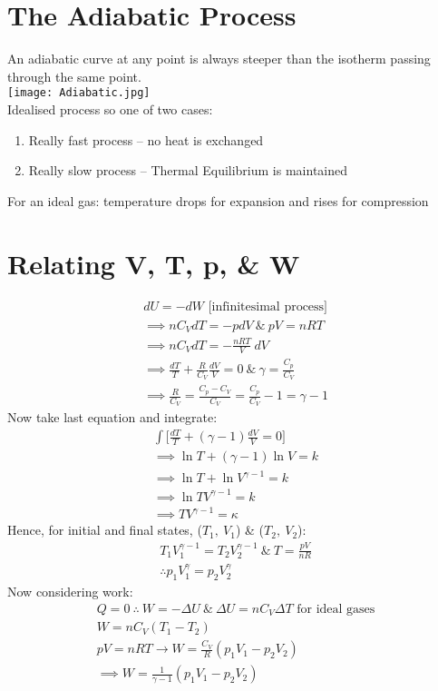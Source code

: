 \documentclass[a4paper, 11pt, fleqn, normalem]{report}
\begin{document}
\section{The Adiabatic Process}
An adiabatic curve at any point is always steeper than the isotherm passing through the same point. \\
\texttt{[image: Adiabatic.jpg]} \\
Idealised process so one of two cases:
\begin{enumerate}
	\item Really fast process -- no heat is exchanged
	\item Really slow process -- Thermal Equilibrium is maintained
\end{enumerate}
For an ideal gas: temperature drops for expansion and rises for compression

\section{Relating V, T, p, \& W}
\vspace{-24pt}
\begin{gather*}
	dU = -dW \text{ [infinitesimal process]} \\
	\implies nC_{V}dT = -pdV ~\&~ pV = nRT \\
	\implies nC_{V}dT = -\frac{nRT}{V}\:dV \\
	\implies \frac{dT}{T} + \frac{R}{C_{V}}\frac{dV}{V} = 0 ~\&~ \gamma = \frac{C_{p}}{C_{V}} \\
	\implies \frac{R}{C_{V}} = \frac{C_{p} - C_{V}}{C_{V}} = \frac{C_{p}}{C_{V}} - 1 = \gamma - 1
\end{gather*}
Now take last equation and integrate:
\begin{gather*}
	\int \bigg[\frac{dT}{T} + (\gamma - 1)\frac{dV}{V} = 0\bigg] \\
	\implies \ln{T} + (\gamma - 1)\ln{V} = k \\
	\implies \ln{T} + \ln{V^{\gamma - 1}} = k \\
	\implies \ln{TV^{\gamma - 1}} = k \\
	\implies TV^{\gamma - 1} = \kappa
\end{gather*}
Hence, for initial and final states, ($T_{1},\:V_{1}$) \& ($T_{2},\:V_{2}$):
\begin{gather*}
	T_{1}V_{1}^{\gamma - 1} = T_{2}V_{2}^{\gamma - 1} ~\&~ T = \frac{pV}{nR} \\
	\therefore p_{1}V_{1}^{\gamma} = p_{2}V_{2}^{\gamma}
\end{gather*}
Now considering work:
\begin{gather*}
	Q = 0 ~\therefore~ W = -{\Delta}U ~\&~ {\Delta}U = nC_{V}{\Delta}T \text{ for ideal gases} \\
	W = nC_{V}(T_{1} - T_{2}) \\
	pV = nRT \rightarrow W = \frac{C_{V}}{R}(p_{1}V_{1} - p_{2}V_{2}) \\
	\implies W = \frac{1}{\gamma - 1}(p_{1}V_{1} - p_{2}V_{2})
\end{gather*}
\end{document}
